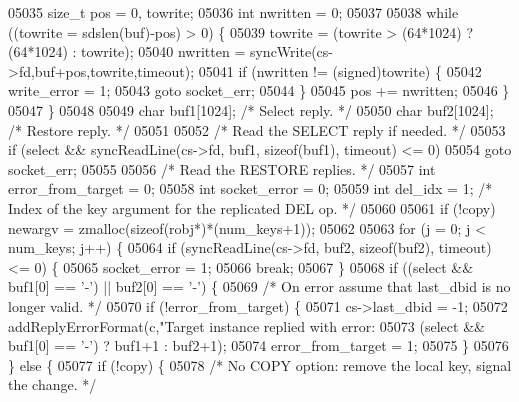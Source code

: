 \begin{DoxyCode}
{{{{{{{{{{{{{{{{{{{{{{{{{{{{{{{{{{{{{{{{{{{{{{{{{{{{{{{{{{{{{{{{{{{{{{{{{{{{{{{{{{{{{{{{{{{{{{{{{{{{{{{{{{{05035         size\_t pos = 0, towrite;
05036         \textcolor{keywordtype}{int} nwritten = 0;
05037 
05038         \textcolor{keywordflow}{while} ((towrite = sdslen(buf)-pos) > 0) \{
05039             towrite = (towrite > (64*1024) ? (64*1024) : towrite);
05040             nwritten = syncWrite(cs->fd,buf+pos,towrite,timeout);
05041             \textcolor{keywordflow}{if} (nwritten != (\textcolor{keywordtype}{signed})towrite) \{
05042                 write\_error = 1;
05043                 \textcolor{keywordflow}{goto} socket\_err;
05044             \}
05045             pos += nwritten;
05046         \}
05047     \}
05048 
05049     \textcolor{keywordtype}{char} buf1[1024]; \textcolor{comment}{/* Select reply. */}
05050     \textcolor{keywordtype}{char} buf2[1024]; \textcolor{comment}{/* Restore reply. */}
05051 
05052     \textcolor{comment}{/* Read the SELECT reply if needed. */}
05053     \textcolor{keywordflow}{if} (select && syncReadLine(cs->fd, buf1, \textcolor{keyword}{sizeof}(buf1), timeout) <= 0)
05054         \textcolor{keywordflow}{goto} socket\_err;
05055 
05056     \textcolor{comment}{/* Read the RESTORE replies. */}
05057     \textcolor{keywordtype}{int} error\_from\_target = 0;
05058     \textcolor{keywordtype}{int} socket\_error = 0;
05059     \textcolor{keywordtype}{int} del\_idx = 1; \textcolor{comment}{/* Index of the key argument for the replicated DEL op. */}
05060 
05061     \textcolor{keywordflow}{if} (!copy) newargv = zmalloc(\textcolor{keyword}{sizeof}(robj*)*(num\_keys+1));
05062 
05063     \textcolor{keywordflow}{for} (j = 0; j < num\_keys; j++) \{
05064         \textcolor{keywordflow}{if} (syncReadLine(cs->fd, buf2, \textcolor{keyword}{sizeof}(buf2), timeout) <= 0) \{
05065             socket\_error = 1;
05066             \textcolor{keywordflow}{break};
05067         \}
05068         \textcolor{keywordflow}{if} ((select && buf1[0] == \textcolor{stringliteral}{'-'}) || buf2[0] == \textcolor{stringliteral}{'-'}) \{
05069             \textcolor{comment}{/* On error assume that last\_dbid is no longer valid. */}
05070             \textcolor{keywordflow}{if} (!error\_from\_target) \{
05071                 cs->last\_dbid = -1;
05072                 addReplyErrorFormat(c,\textcolor{stringliteral}{"Target instance replied with error: %
05073                     (select && buf1[0] == \textcolor{stringliteral}{'-'}) ? buf1+1 : buf2+1);
05074                 error\_from\_target = 1;
05075             \}
05076         \} \textcolor{keywordflow}{else} \{
05077             \textcolor{keywordflow}{if} (!copy) \{
05078                 \textcolor{comment}{/* No COPY option: remove the local key, signal the change. */}
}}}}}}}}}}}}}}}}}}}}}}}}}}}}}}}}}}}}}}}}}}}}}}}}}}}}}}}}}}}}}}}}}}}}}}}}}}}}}}}}}}}}}}}}}}}}}}}}}}}}}}}}}}}}
\end{DoxyCode}

